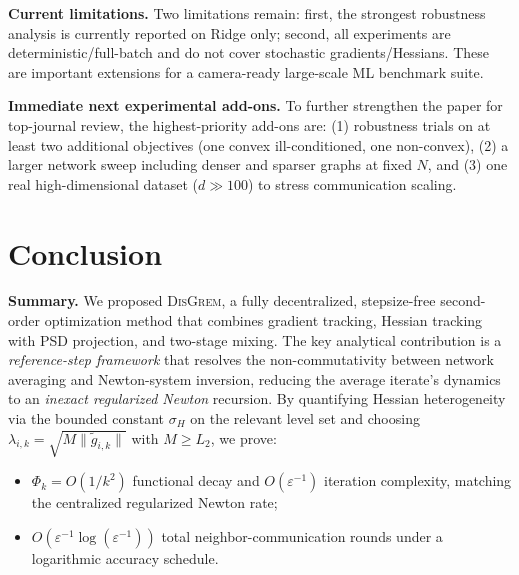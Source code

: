 \documentclass[11pt,a4paper]{article}
\def\cO{O}%
\newcommand{\cO}{\mathcal{O}}
\begin{document}
	\noindent\textbf{Current limitations.}
	Two limitations remain: first, the strongest robustness analysis is currently reported on Ridge only;
	second, all experiments are deterministic/full-batch and do not cover stochastic gradients/Hessians.
	These are important extensions for a camera-ready large-scale ML benchmark suite.

	\noindent\textbf{Immediate next experimental add-ons.}
	To further strengthen the paper for top-journal review, the highest-priority add-ons are:
	(1) robustness trials on at least two additional objectives (one convex ill-conditioned, one non-convex),
	(2) a larger network sweep including denser and sparser graphs at fixed $N$,
	and (3) one real high-dimensional dataset ($d\gg 100$) to stress communication scaling.
	
	\section{Conclusion}
	
	\noindent\textbf{Summary.}
	We proposed \textsc{DisGrem}, a fully decentralized, stepsize-free second-order optimization
	method that combines gradient tracking, Hessian tracking with PSD projection,
	and two-stage mixing.
	The key analytical contribution is a \emph{reference-step framework} that resolves the
	non-commutativity between network averaging and Newton-system inversion,
	reducing the average iterate's dynamics to an \emph{inexact regularized Newton} recursion.
	By quantifying Hessian heterogeneity via the bounded constant $\sigma_H$ on the relevant level set
	and choosing $\lambda_{i,k}=\sqrt{M\|\tilde g_{i,k}\|}$ with $M\ge L_2$,
	we prove:
	\begin{itemize}[leftmargin=1.2em,itemsep=2pt]
		\item $\Phi_k = \cO(1/k^2)$ functional decay and $\cO(\varepsilon^{-1})$ iteration complexity,
		matching the centralized regularized Newton rate;
		\item $\cO(\varepsilon^{-1}\log(\varepsilon^{-1}))$ total neighbor-communication rounds
		under a logarithmic accuracy schedule.
	\end{itemize}
	
\end{document}
